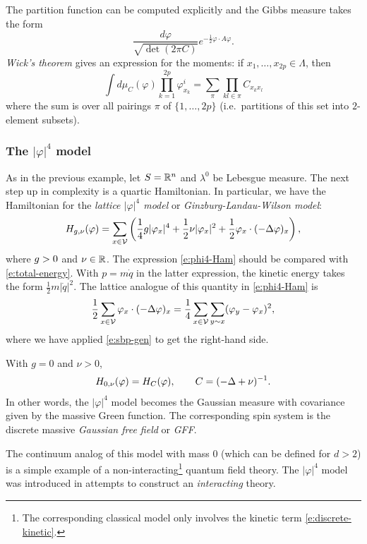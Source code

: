 The partition function can be computed explicitly and the Gibbs measure takes
the form
\begin{equation}
\label{e:gauss-density}
\frac{d\varphi}{\sqrt{\det(2\pi C)}}
e^{-\tfrac12 \varphi \cdot A \varphi}.
\end{equation}
\emph{Wick's theorem} gives an expression for the moments:
if $x_1, \ldots, x_{2p} \in \Lambda$, then
\begin{equation}
\label{e:wick}
\int d\mu_C(\varphi) \prod_{k=1}^{2p} \varphi^i_{x_k}
	=
\sum_\pi \prod_{kl\in\pi} C_{x_kx_l}
\end{equation}
where the sum is over all pairings $\pi$ of $\{1,\ldots,2p\}$ (i.e.\ partitions of
this set into $2$-element subsets).

\subsubsection{The $|\varphi|^4$ model}

As in the previous example, let $S = {\mathbb R}^n$ and $\lambda^0$ be Lebesgue measure.
The next step up in complexity is a quartic Hamiltonian. In particular, we have
the Hamiltonian for the \emph{lattice $|\varphi|^4$ model} or \emph{Ginzburg-Landau-Wilson model}:
\begin{equation}
\label{e:phi4-Ham}
H_{g,\nu}(\varphi)
  =
\sum_{x\in\mathcal{V}}
\left(
  \frac{1}{4} g |\varphi_x|^4
    +
  \frac{1}{2} \nu |\varphi_x|^2
    +
  \frac{1}{2} \varphi_x \cdot (-\Delta \varphi)_x
\right),
\end{equation}
where $g > 0$ and $\nu\in{\mathbb R}$.
The expression \eqref{e:phi4-Ham} should be compared with \eqref{e:total-energy}.
With $p = m \dot q$ in the latter expression, the kinetic energy takes the form
$\tfrac12 m |\dot q|^2$. The lattice analogue of this quantity in \eqref{e:phi4-Ham} is
\begin{equation}
\label{e:discrete-kinetic}
\frac12 \sum_{x\in\mathcal{V}} \varphi_x \cdot (-\Delta \varphi)_x
	=
\frac14 \sum_{x\in\mathcal{V}} \sum_{y\sim x} (\varphi_y - \varphi_x)^2,
\end{equation}
where we have applied \eqref{e:sbp-gen} to get the right-hand side.

\begin{example}
With $g = 0$ and $\nu > 0$,
\begin{equation}
H_{0,\nu}(\varphi) = H_C(\varphi),
	\qquad
C = (-\Delta + \nu)^{-1}.
\end{equation}
In other words, the $|\varphi|^4$ model becomes the Gaussian measure with covariance given
by the massive Green function. The corresponding spin system is the discrete massive
\emph{Gaussian free field} or \emph{GFF}.

The continuum analog of this model with mass $0$
(which can be defined for $d > 2$) is a simple example of a
non-interacting\footnote{The corresponding classical model only involves the kinetic term
\eqref{e:discrete-kinetic}.} quantum field theory. The $|\varphi|^4$ model was introduced
in attempts to construct an \emph{interacting} theory.
\end{example}

